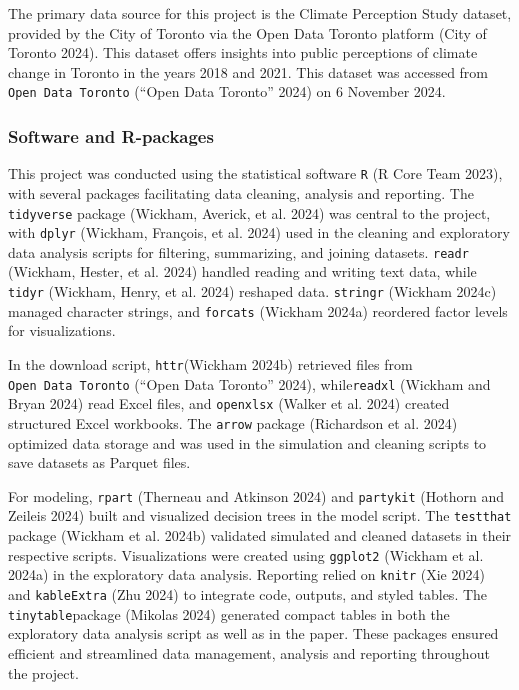 \documentclass[
  letterpaper,
  DIV=11,
  numbers=noendperiod]{scrartcl}
\begin{document}
The primary data source for this project is the Climate Perception Study
dataset, provided by the City of Toronto via the Open Data Toronto
platform (City of Toronto 2024). This dataset offers insights into
public perceptions of climate change in Toronto in the years 2018 and
2021. This dataset was accessed from \texttt{Open\ Data\ Toronto}
({``Open Data Toronto''} 2024) on 6 November 2024.

\subsubsection{Software and R-packages}\label{software-and-r-packages}

This project was conducted using the statistical software \texttt{R} (R
Core Team 2023), with several packages facilitating data cleaning,
analysis and reporting. The \texttt{tidyverse} package (Wickham,
Averick, et al. 2024) was central to the project, with \texttt{dplyr}
(Wickham, François, et al. 2024) used in the cleaning and exploratory
data analysis scripts for filtering, summarizing, and joining datasets.
\texttt{readr} (Wickham, Hester, et al. 2024) handled reading and
writing text data, while \texttt{tidyr} (Wickham, Henry, et al. 2024)
reshaped data. \texttt{stringr} (Wickham 2024c) managed character
strings, and \texttt{forcats} (Wickham 2024a) reordered factor levels
for visualizations.

In the download script, \texttt{httr}(Wickham 2024b) retrieved files
from \texttt{Open\ Data\ Toronto} ({``Open Data Toronto''} 2024),
while\texttt{readxl} (Wickham and Bryan 2024) read Excel files, and
\texttt{openxlsx} (Walker et al. 2024) created structured Excel
workbooks. The \texttt{arrow} package (Richardson et al. 2024) optimized
data storage and was used in the simulation and cleaning scripts to save
datasets as Parquet files.

For modeling, \texttt{rpart} (Therneau and Atkinson 2024) and
\texttt{partykit} (Hothorn and Zeileis 2024) built and visualized
decision trees in the model script. The \texttt{testthat} package
(Wickham et al. 2024b) validated simulated and cleaned datasets in their
respective scripts. Visualizations were created using \texttt{ggplot2}
(Wickham et al. 2024a) in the exploratory data analysis. Reporting
relied on \texttt{knitr} (Xie 2024) and \texttt{kableExtra} (Zhu 2024)
to integrate code, outputs, and styled tables. The
\texttt{tinytable}package (Mikolas 2024) generated compact tables in
both the exploratory data analysis script as well as in the paper. These
packages ensured efficient and streamlined data management, analysis and
reporting throughout the project.
\end{document}

